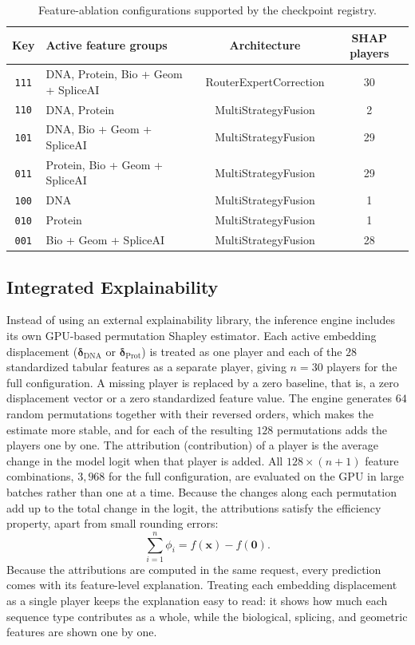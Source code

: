 \begin{table}[htbp]
    \centering
    \caption{Feature-ablation configurations supported by the checkpoint registry.}
    \label{tab:ablation_configs}
    \begin{tabular}{clcc}
        \toprule
        \textbf{Key} & \textbf{Active feature groups} & \textbf{Architecture} & \textbf{SHAP players} \\
        \midrule
        \texttt{111} & DNA, Protein, Bio + Geom + SpliceAI & RouterExpertCorrection & 30 \\
        \texttt{110} & DNA, Protein & MultiStrategyFusion & 2 \\
        \texttt{101} & DNA, Bio + Geom + SpliceAI & MultiStrategyFusion & 29 \\
        \texttt{011} & Protein, Bio + Geom + SpliceAI & MultiStrategyFusion & 29 \\
        \texttt{100} & DNA & MultiStrategyFusion & 1 \\
        \texttt{010} & Protein & MultiStrategyFusion & 1 \\
        \texttt{001} & Bio + Geom + SpliceAI & MultiStrategyFusion & 28 \\
        \bottomrule
    \end{tabular}
\end{table}

\subsection{Integrated Explainability}

Instead of using an external explainability library, the inference engine includes its own GPU-based permutation Shapley estimator. Each active embedding displacement ($\boldsymbol{\delta}_{\text{DNA}}$ or $\boldsymbol{\delta}_{\text{Prot}}$) is treated as one player and each of the $28$ standardized tabular features as a separate player, giving $n = 30$ players for the full configuration. A missing player is replaced by a zero baseline, that is, a zero displacement vector or a zero standardized feature value. The engine generates $64$ random permutations together with their reversed orders, which makes the estimate more stable, and for each of the resulting $128$ permutations adds the players one by one. The attribution (contribution) of a player is the average change in the model logit when that player is added. All $128 \times (n + 1)$ feature combinations, $3{,}968$ for the full configuration, are evaluated on the GPU in large batches rather than one at a time. Because the changes along each permutation add up to the total change in the logit, the attributions satisfy the efficiency property, apart from small rounding errors:
\[
    \sum_{i=1}^{n} \phi_i = f(\mathbf{x}) - f(\mathbf{0}).
\]
Because the attributions are computed in the same request, every prediction comes with its feature-level explanation. Treating each embedding displacement as a single player keeps the explanation easy to read: it shows how much each sequence type contributes as a whole, while the biological, splicing, and geometric features are shown one by one.

